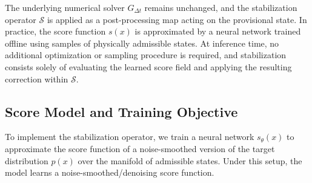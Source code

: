 \documentclass[letterpaper]{article} %
\begin{document}
The underlying numerical solver $G_{\Delta t}$ remains unchanged, and the stabilization operator $\mathcal{S}$ is applied as a post-processing map acting on the provisional state. 
In practice, the score function $s(x)$ is approximated by a neural network trained offline using samples of physically admissible states. At inference time, no additional optimization or sampling procedure is required, and stabilization consists solely of evaluating the learned score field and applying the resulting correction within $\mathcal{S}$.


\subsection{Score Model and Training Objective}
To implement the stabilization operator, we train a neural network $s_\theta(x)$ to approximate the score function of a noise-smoothed version of the target distribution $p(x)$ over the manifold of admissible states. Under this setup, the model learns a noise-smoothed/denoising score function.
\end{document}
